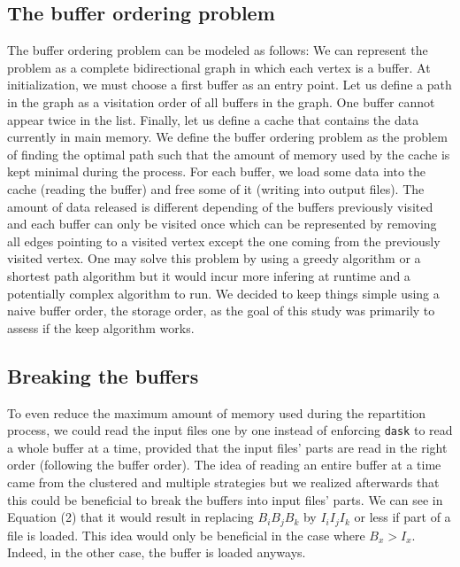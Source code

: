 \documentclass[conference]{IEEEtran}
\begin{document}
\subsection{The buffer ordering problem}
The buffer ordering problem can be modeled as follows: We can represent the
problem as a complete bidirectional graph in which each vertex is a buffer. At
initialization, we must choose a first buffer as an entry point. Let us define
a path in the graph as a visitation order of all buffers in the graph. One buffer
cannot appear twice in the list. Finally, let us define a cache that contains
the data currently in main memory. We define the buffer ordering problem as the
problem of finding the optimal path such that the amount of memory used by the
cache is kept minimal during the process. For each buffer, we load some data
into the cache (reading the buffer) and free some of it (writing into output files). The amount of
data released is different depending of the buffers previously visited and each
buffer can only be visited once which can be represented by removing all edges
pointing to a visited vertex except the one coming from the previously visited
vertex. One may solve this problem by using a greedy algorithm or a shortest path
algorithm but it would
incur more infering at runtime and a potentially complex algorithm to run.
We decided to keep things simple using a naive buffer order, the storage order,
as the goal of this study was primarily to assess if the keep algorithm works.

\subsection{Breaking the buffers}
To even reduce the maximum amount of memory used during the repartition process, we
could read the input files one by one instead of enforcing \texttt{dask} to read a whole
buffer at a time, provided that the input files' parts are read in the right
order (following the buffer order). The idea of reading an entire buffer at a
time came from the clustered and multiple strategies but we realized afterwards
that this could be beneficial to break the buffers into input files' parts. We
can see in Equation (2) that it would result in replacing $B_iB_jB_k$ by
$I_iI_jI_k$ or less if part of a file is loaded. This idea would only be
beneficial in the case where $B_x>I_x$. Indeed, in the other case, the buffer is
loaded anyways.
\end{document}
